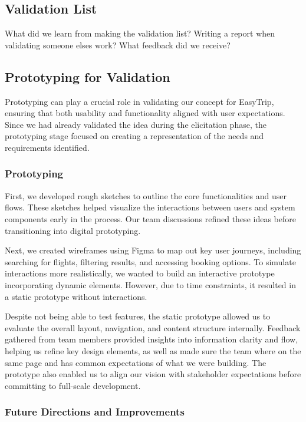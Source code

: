 \subsection{Validation List}
What did we learn from making the validation list?
Writing a report when validating someone elses work?
What feedback did we receive?


\subsection{Prototyping for Validation}
Prototyping can play a crucial role in validating our concept for EasyTrip, ensuring that both usability and functionality aligned with user expectations. Since we had already validated the idea during the elicitation phase, the prototyping stage focused on creating a representation of the needs and requirements identified.
\subsubsection{Prototyping}
First, we developed rough sketches to outline the core functionalities and user flows. These sketches helped visualize the interactions between users and system components early in the process. Our team discussions refined these ideas before transitioning into digital prototyping.

Next, we created wireframes using Figma to map out key user journeys, including searching for flights, filtering results, and accessing booking options. To simulate interactions more realistically, we wanted to build an interactive prototype incorporating dynamic elements. However, due to time constraints, it resulted in a static prototype without interactions.

Despite not being able to test features, the static prototype allowed us to evaluate the overall layout, navigation, and content structure internally. Feedback gathered from team members provided insights into information clarity and flow, helping us refine key design elements, as well as made sure the team where on the same page and has common expectations of what we were building. The prototype also enabled us to align our vision with stakeholder expectations before committing to full-scale development.

\subsubsection{Future Directions and Improvements}

